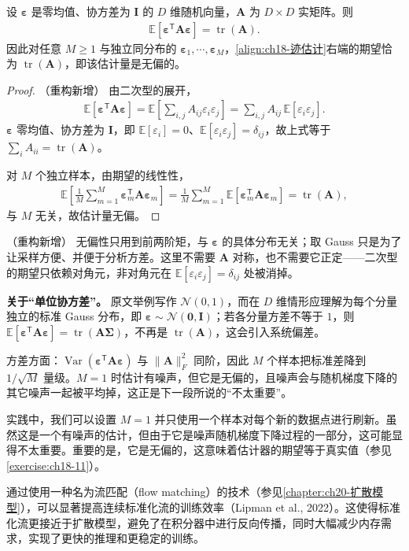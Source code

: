 \documentclass[../../main.tex]{subfiles}
\begin{document}
\begin{proposition}[迹估计量的无偏性]\label{proposition:ch18-迹估计无偏}
设 $\bm{\varepsilon}$ 是零均值、协方差为 $\bm{I}$ 的 $D$ 维随机向量，$\bm{A}$ 为 $D\times D$ 实矩阵。则
\begin{align*}
  \mathbb{E}\left[\bm{\varepsilon}^{\mathsf T}\bm{A}\bm{\varepsilon}\right]=\operatorname{tr}(\bm{A}).
\end{align*}
因此对任意 $M\geqslant1$ 与独立同分布的 $\bm{\varepsilon}_1,\cdots,\bm{\varepsilon}_M$，\eqref{align:ch18-迹估计}右端的期望恰为 $\operatorname{tr}(\bm{A})$，即该估计量是无偏的。
\end{proposition}

\begin{proof}（重构新增）
由二次型的展开，
\begin{align*}
  \mathbb{E}\left[\bm{\varepsilon}^{\mathsf T}\bm{A}\bm{\varepsilon}\right]=\mathbb{E}\left[\sum_{i,j}A_{ij}\varepsilon_i\varepsilon_j\right]=\sum_{i,j}A_{ij}\,\mathbb{E}\left[\varepsilon_i\varepsilon_j\right].
\end{align*}
$\bm{\varepsilon}$ 零均值、协方差为 $\bm{I}$，即 $\mathbb{E}[\varepsilon_i]=0$、$\mathbb{E}[\varepsilon_i\varepsilon_j]=\delta_{ij}$，故上式等于 $\sum_{i}A_{ii}=\operatorname{tr}(\bm{A})$。

对 $M$ 个独立样本，由期望的线性性，
\begin{align*}
  \mathbb{E}\left[\frac{1}{M}\sum_{m=1}^{M}\bm{\varepsilon}_m^{\mathsf T}\bm{A}\bm{\varepsilon}_m\right]=\frac{1}{M}\sum_{m=1}^{M}\mathbb{E}\left[\bm{\varepsilon}_m^{\mathsf T}\bm{A}\bm{\varepsilon}_m\right]=\operatorname{tr}(\bm{A}),
\end{align*}
与 $M$ 无关，故估计量无偏。
\end{proof}

\begin{remark}（重构新增）
无偏性只用到前两阶矩，与 $\bm{\varepsilon}$ 的具体分布无关；取 Gauss 只是为了让采样方便、并便于分析方差。这里不需要 $\bm{A}$ 对称，也不需要它正定——二次型的期望只依赖对角元，非对角元在 $\mathbb{E}[\varepsilon_i\varepsilon_j]=\delta_{ij}$ 处被消掉。

\textbf{关于“单位协方差”。} 原文举例写作 $\mathcal{N}(0,1)$，而在 $D$ 维情形应理解为每个分量独立的标准 Gauss 分布，即 $\bm{\varepsilon}\sim\mathcal{N}(\bm{0},\bm{I})$；若各分量方差不等于 $1$，则 $\mathbb{E}[\bm{\varepsilon}^{\mathsf T}\bm{A}\bm{\varepsilon}]=\operatorname{tr}(\bm{A}\bm{\Sigma})$，不再是 $\operatorname{tr}(\bm{A})$，这会引入系统偏差。

方差方面：$\operatorname{Var}(\bm{\varepsilon}^{\mathsf T}\bm{A}\bm{\varepsilon})$ 与 $\|\bm{A}\|_F^{2}$ 同阶，因此 $M$ 个样本把标准差降到 $1/\sqrt{M}$ 量级。$M=1$ 时估计有噪声，但它是无偏的，且噪声会与随机梯度下降的其它噪声一起被平均掉，这正是下一段所说的“不太重要”。
\end{remark}

实践中，我们可以设置 $M=1$ 并只使用一个样本对每个新的数据点进行刷新。虽然这是一个有噪声的估计，但由于它是噪声随机梯度下降过程的一部分，这可能显得不太重要。重要的是，它是无偏的，这意味着估计器的期望等于真实值（参见\cref{exercise:ch18-11}）。

通过使用一种名为流匹配（flow matching）的技术（参见\cref{chapter:ch20-扩散模型}），可以显著提高连续标准化流的训练效率（Lipman et al., 2022）。这使得标准化流更接近于扩散模型，避免了在积分器中进行反向传播，同时大幅减少内存需求，实现了更快的推理和更稳定的训练。
\end{document}
